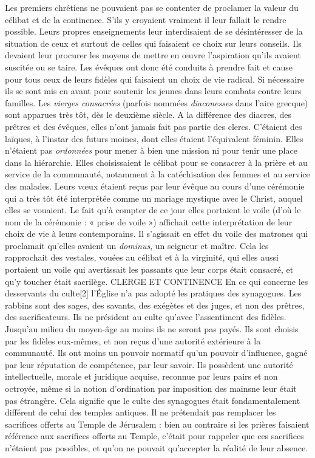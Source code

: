  Les premiers chrétiens ne pouvaient pas se contenter de proclamer la valeur du célibat et de la continence. S'ils y croyaient vraiment il leur fallait le rendre possible. Leurs propres enseignements leur interdisaient de se désintéresser de la situation de ceux et surtout de celles qui faisaient ce choix sur leurs conseils. Ils devaient leur procurer les moyens de mettre en œuvre l'aspiration qu'ils avaient suscitée ou se taire. Les évêques ont donc été conduits à prendre fait et cause pour tous ceux de leurs fidèles qui faisaient un choix de vie radical. Si nécessaire ils se sont mis en avant pour soutenir les jeunes dans leurs combats contre leurs familles. 
 Les \emph{vierges consacrées} (parfois nommées\emph{ diaconesses} dans l'aire grecque) sont apparues très tôt, dès le deuxième siècle. A la différence des diacres, des prêtres et des évêques, elles n'ont jamais fait pas partie des clercs. C'étaient des laïques, à l'instar des futurs moines, dont elles étaient l'équivalent féminin. Elles n'étaient pas \emph{ordonnées} pour mener à bien une mission ni pour tenir une place dans la hiérarchie. Elles choisissaient le célibat pour se consacrer à la prière et au service de la communauté, notamment à la catéchisation des femmes et au service des malades. Leurs vœux étaient reçus par leur évêque au cours d'une cérémonie qui a très tôt été interprétée comme un mariage mystique avec le Christ, auquel elles se vouaient. Le fait qu'à compter de ce jour elles portaient le voile (d'où le nom de la cérémonie : « prise de voile ») affichait cette interprétation de leur choix de vie à leurs contemporains. Il s'agissait en effet du voile des matrones qui proclamait qu'elles avaient un \emph{dominus}, un seigneur et maître. Cela les rapprochait des vestales, vouées au célibat et à la virginité, qui elles aussi portaient un voile qui avertissait les passants que leur corps était consacré, et qu'y toucher était sacrilège.
CLERGE ET CONTINENCE 
 En ce qui concerne les desservants du culte[2] l'Église n'a pas adopté les pratiques des synagogues. Les rabbins sont des sages, des savants, des exégètes et des juges, et non des prêtres, des sacrificateurs. Ils ne président au culte qu'avec l'assentiment des fidèles. Jusqu'au milieu du moyen-âge au moins ils ne seront pas payés. Ils sont choisis par les fidèles eux-mêmes, et non reçus d'une autorité extérieure à la communauté. Ils ont moins un pouvoir normatif qu'un pouvoir d'influence, gagné par leur réputation de compétence, par leur savoir. Ils possèdent une autorité intellectuelle, morale et juridique acquise, reconnue par leurs pairs et non octroyée, même si la notion d'ordination par imposition des mains\emph{}ne leur était pas étrangère. Cela signifie que le culte des synagogues était fondamentalement différent de celui des temples antiques. Il ne prétendait pas remplacer les sacrifices offerts au Temple de Jérusalem : bien au contraire si les prières faisaient référence aux sacrifices offerts au Temple, c'était pour rappeler que ces sacrifices n'étaient pas possibles, et qu'on ne pouvait qu'accepter la réalité de leur absence. 
